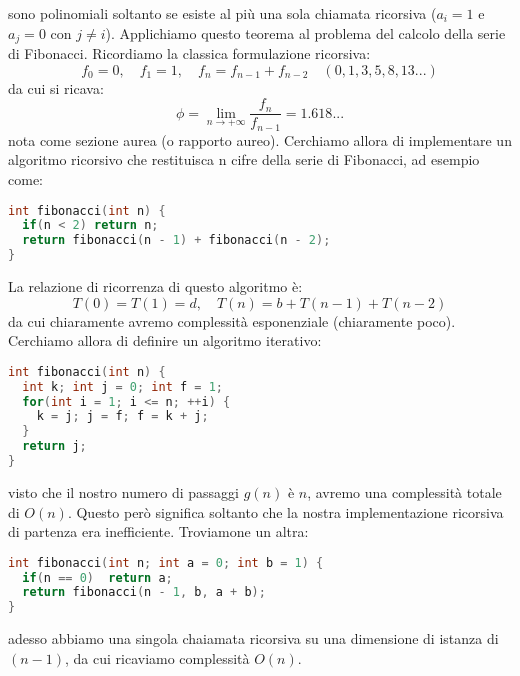 \documentclass[a4paper,12pt]{article}
\begin{document}
sono polinomiali soltanto se esiste al più una sola chiamata ricorsiva ($a_i = 1$ e $a_j = 0$ con $j \not= i$).
Applichiamo questo teorema al problema del calcolo della serie di Fibonacci. Ricordiamo la classica formulazione ricorsiva:
$$ f_0 = 0, \quad f_1 = 1, \quad f_n = f_{n-1}+f_{n-2} \quad (0, 1, 3, 5, 8, 13...) $$
da cui si ricava:
$$\phi = \lim_{n\rightarrow +\infty} \frac{f_n}{f_{n-1}} = 1.618... $$
nota come sezione aurea (o rapporto aureo). Cerchiamo allora di implementare un algoritmo ricorsivo che restituisca n
cifre della serie di Fibonacci, ad esempio come:
\begin{lstlisting}[language=C++]
int fibonacci(int n) {
  if(n < 2) return n;
  return fibonacci(n - 1) + fibonacci(n - 2);
}
\end{lstlisting}
La relazione di ricorrenza di questo algoritmo è:
$$ T(0) = T(1) = d, \quad T(n) = b + T(n-1) + T(n-2) $$
da cui chiaramente avremo complessità esponenziale (chiaramente poco). Cerchiamo allora di definire un algoritmo iterativo:
\begin{lstlisting}[language=C++]
int fibonacci(int n) {
  int k; int j = 0; int f = 1;
  for(int i = 1; i <= n; ++i) {
    k = j; j = f; f = k + j;
  }
  return j;
}
\end{lstlisting}
visto che il nostro numero di passaggi $g(n)$ è $n$, avremo una complessità totale di $O(n)$. Questo però
significa soltanto che la nostra implementazione ricorsiva di partenza era inefficiente. Troviamone un altra:
\begin{lstlisting}[language=C++]
int fibonacci(int n; int a = 0; int b = 1) {
  if(n == 0)  return a;
  return fibonacci(n - 1, b, a + b);
}
\end{lstlisting}
adesso abbiamo una singola chaiamata ricorsiva su una dimensione di istanza di $(n-1)$, da cui ricaviamo complessità $O(n)$.
\end{document}
